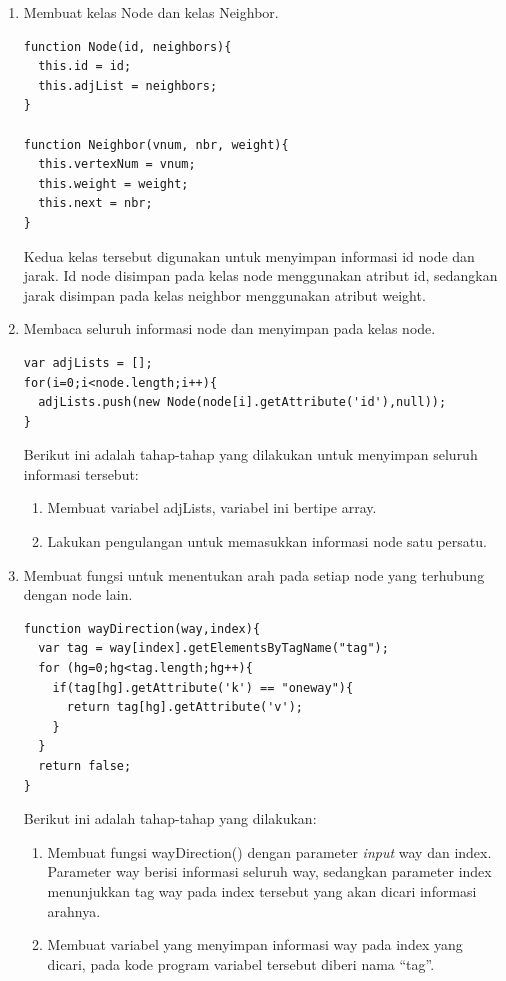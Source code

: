 \begin{enumerate}
  \item Membuat kelas Node dan kelas Neighbor.
\begin{verbatim}
function Node(id, neighbors){
  this.id = id;
  this.adjList = neighbors;
}

function Neighbor(vnum, nbr, weight){
  this.vertexNum = vnum;
  this.weight = weight;
  this.next = nbr;
}
\end{verbatim}
Kedua kelas tersebut digunakan untuk menyimpan informasi id node dan jarak. Id
node disimpan pada kelas node menggunakan atribut id, sedangkan jarak disimpan
pada kelas neighbor menggunakan atribut weight.

  \item Membaca seluruh informasi node dan menyimpan pada kelas node.
\begin{verbatim}
var adjLists = [];
for(i=0;i<node.length;i++){
  adjLists.push(new Node(node[i].getAttribute('id'),null));
}
\end{verbatim}
  Berikut ini adalah tahap-tahap yang dilakukan untuk menyimpan seluruh
  informasi tersebut:
  \begin{enumerate}
    \item Membuat variabel adjLists, variabel ini bertipe array.
    
    \item Lakukan pengulangan untuk memasukkan informasi node satu persatu.
  \end{enumerate}

  \item Membuat fungsi untuk menentukan arah pada setiap node yang terhubung
  dengan node lain.
\begin{verbatim}
function wayDirection(way,index){
  var tag = way[index].getElementsByTagName("tag");
  for (hg=0;hg<tag.length;hg++){
    if(tag[hg].getAttribute('k') == "oneway"){
      return tag[hg].getAttribute('v');
    }
  }
  return false;
}
\end{verbatim}
  Berikut ini adalah tahap-tahap yang dilakukan:
  \begin{enumerate}
  \item Membuat fungsi wayDirection() dengan parameter \textit{input} way dan
  index. Parameter way berisi informasi seluruh way, sedangkan parameter index
  menunjukkan tag way pada index tersebut yang akan dicari informasi arahnya.
  
  \item Membuat variabel yang menyimpan informasi way pada index yang dicari,
  pada kode program variabel tersebut diberi nama ``tag''.
  

\end{enumerate}
\end{enumerate}
